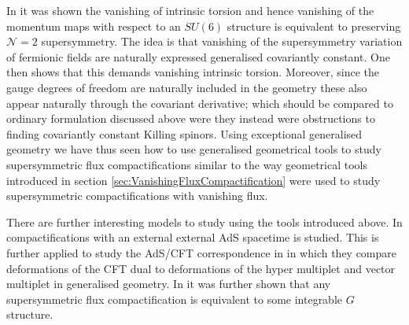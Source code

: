 In \cite{Coimbra:2014uxa,Ashmore:2015joa} it was shown the vanishing of intrinsic torsion and hence vanishing of the momentum maps with respect to an $SU(6)$ structure is equivalent to preserving $\mathcal{N}=2$ supersymmetry. The idea is that vanishing of the supersymmetry variation of fermionic fields are naturally expressed generalised covariantly constant. One then shows that this demands vanishing intrinsic torsion. Moreover, since the gauge degrees of freedom are naturally included in the geometry these also appear naturally through the covariant derivative; which should be compared to ordinary formulation discussed above were they instead were obstructions to finding covariantly constant Killing spinors. Using exceptional generalised geometry we have thus seen how to use generalised geometrical tools to study supersymmetric flux compactifications similar to the way geometrical tools introduced in section \ref{sec:VanishingFluxCompactification} were used to study supersymmetric compactifications with vanishing flux. 

There are further interesting models to study using the tools introduced above. In \cite{Grana:2016dyl,Ashmore:2016qvs} compactifications with an external external AdS spacetime is studied. This is further applied to study the AdS/CFT correspondence in \cite{Ashmore:2016oug} in which they compare deformations of the CFT dual to deformations of the hyper multiplet and vector multiplet in generalised geometry. In \cite{Coimbra:2016ydd} it was further shown that any supersymmetric flux compactification is equivalent to some integrable $G$ structure. 




